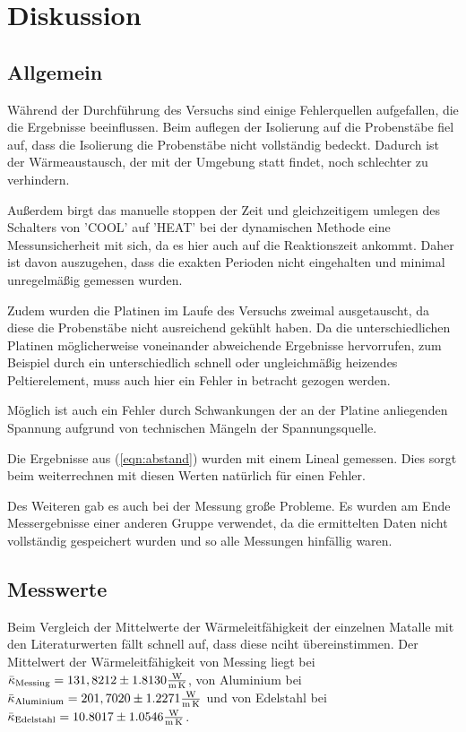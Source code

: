 \section{Diskussion}
\subsection{Allgemein}
Während der Durchführung des Versuchs sind einige Fehlerquellen aufgefallen, die die Ergebnisse beeinflussen.
Beim auflegen der Isolierung auf die Probenstäbe fiel auf, dass die Isolierung die Probenstäbe nicht vollständig bedeckt.
Dadurch ist der Wärmeaustausch, der mit der Umgebung statt findet, noch schlechter zu verhindern.

\noindent Außerdem birgt das manuelle stoppen der Zeit und gleichzeitigem umlegen des Schalters von 'COOL' auf 'HEAT' bei der dynamischen Methode eine Messunsicherheit mit sich, 
da es hier auch auf die Reaktionszeit ankommt.
Daher ist davon auszugehen, dass die exakten Perioden nicht eingehalten und minimal unregelmäßig gemessen wurden.

\noindent Zudem wurden die Platinen im Laufe des Versuchs zweimal ausgetauscht, da diese die Probenstäbe nicht ausreichend gekühlt haben.
Da die unterschiedlichen Platinen möglicherweise voneinander abweichende Ergebnisse hervorrufen, 
zum Beispiel durch ein unterschiedlich schnell oder ungleichmäßig heizendes Peltierelement, muss auch hier ein Fehler in betracht gezogen werden.

\noindent Möglich ist auch ein Fehler durch Schwankungen der an der Platine anliegenden Spannung aufgrund von technischen Mängeln der Spannungsquelle.

\noindent Die Ergebnisse aus (\ref{eqn:abstand})
wurden mit einem Lineal gemessen. Dies sorgt beim weiterrechnen mit diesen Werten natürlich für einen Fehler.

\noindent
Des Weiteren gab es auch bei der Messung große Probleme.
Es wurden am Ende Messergebnisse einer anderen Gruppe verwendet, da die ermittelten Daten nicht vollständig gespeichert wurden und so alle Messungen hinfällig waren. 

\label{sec:Diskussion}

\subsection{Messwerte}
\noindent
Beim Vergleich der Mittelwerte der Wärmeleitfähigkeit der einzelnen Matalle mit den Literaturwerten fällt schnell auf, dass diese nciht übereinstimmen. Der Mittelwert der Wärmeleitfähigkeit von
Messing liegt bei $\bar{\kappa}_\text{Messing} = 131,8212 \pm 1.8130 \si[per-mode=fraction]{\watt\per\meter\per\kelvin}$, von Aluminium bei $\bar{\kappa}_\text{Aluminium} = 201,7020 \pm 1.2271 \si[per-mode=fraction]{\watt\per\meter\per\kelvin}$
und von Edelstahl bei $\bar{\kappa}_\text{Edelstahl} = 10.8017 \pm 1.0546 \si[per-mode=fraction]{\watt\per\meter\per\kelvin}$. 

